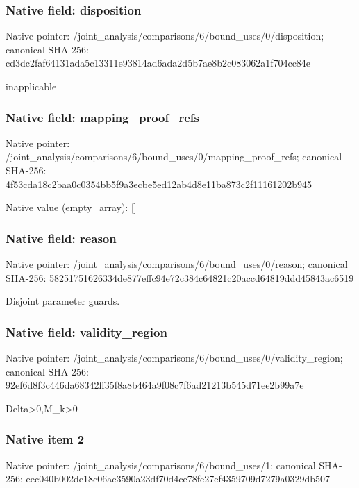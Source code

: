 \documentclass[10pt,a4paper]{article}
\begin{document}
\subsubsection{Native field: disposition}
Native pointer: /joint\_\allowbreak{}analysis/comparisons/6/bound\_\allowbreak{}uses/0/disposition; canonical SHA-256: cd3dc2faf64131ada5c13311e93814ad6ada2d5b7ae8b2c083062a1f704cc84e

\begingroup\raggedright\sloppy inapplicable\par\endgroup

\subsubsection{Native field: mapping\_\allowbreak{}proof\_\allowbreak{}refs}
Native pointer: /joint\_\allowbreak{}analysis/comparisons/6/bound\_\allowbreak{}uses/0/mapping\_\allowbreak{}proof\_\allowbreak{}refs; canonical SHA-256: 4f53cda18c2baa0c0354bb5f9a3ecbe5ed12ab4d8e11ba873c2f11161202b945

Native value (empty\_\allowbreak{}array): []

\subsubsection{Native field: reason}
Native pointer: /joint\_\allowbreak{}analysis/comparisons/6/bound\_\allowbreak{}uses/0/reason; canonical SHA-256: 58251751626334de877effc94e72c384c64821c20accd64819ddd45843ac6519

\begingroup\raggedright\sloppy Disjoint parameter guards.\par\endgroup

\subsubsection{Native field: validity\_\allowbreak{}region}
Native pointer: /joint\_\allowbreak{}analysis/comparisons/6/bound\_\allowbreak{}uses/0/validity\_\allowbreak{}region; canonical SHA-256: 92ef6d8f3c446da68342ff35f8a8b464a9f08c7f6ad21213b545d71ee2b99a7e

\begingroup\raggedright\sloppy Delta>0,\allowbreak{}M\_\allowbreak{}k>0\par\endgroup

\subsubsection{Native item 2}
Native pointer: /joint\_\allowbreak{}analysis/comparisons/6/bound\_\allowbreak{}uses/1; canonical SHA-256: eec040b002de18c06ac3590a23df70d4ce78fe27ef4359709d7279a0329db507
\end{document}
